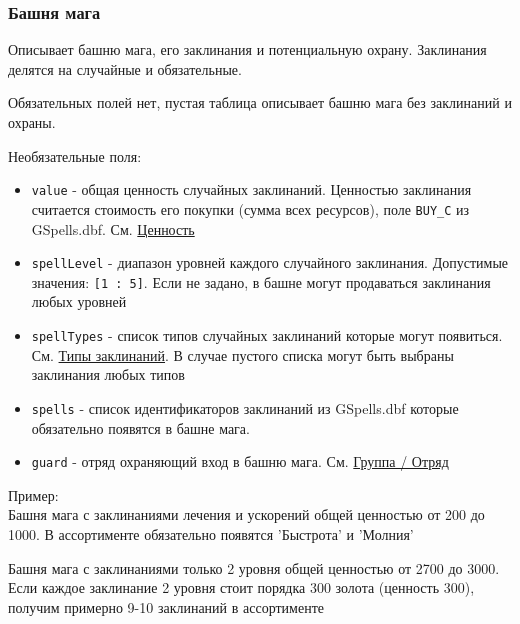 \subsubsection{Башня мага}
\label{mage}
Описывает башню мага, его заклинания и потенциальную охрану. Заклинания делятся на случайные и обязательные.

Обязательных полей нет, пустая таблица описывает башню мага без заклинаний и охраны.

Необязательные поля:
\begin{itemize}
\item \texttt{value} - общая ценность случайных заклинаний. Ценностью заклинания считается стоимость его покупки (сумма всех ресурсов), поле \texttt{BUY\_C} из GSpells.dbf.  См. \hyperref[value]{Ценность}
\item \texttt{spellLevel} - диапазон уровней каждого случайного заклинания. Допустимые значения: \texttt{[1 : 5]}. Если не задано, в башне могут продаваться заклинания любых уровней
\item \texttt{spellTypes} - список типов случайных заклинаний которые могут появиться. См. \hyperref[spellTypes]{Типы заклинаний}. В случае пустого списка могут быть выбраны заклинания любых типов
\item \texttt{spells} - список идентификаторов заклинаний из GSpells.dbf которые обязательно появятся в башне мага.
\item \texttt{guard} - отряд охраняющий вход в башню мага. См. \hyperref[group]{Группа / Отряд}
\end{itemize}

Пример:\\
Башня мага с заклинаниями лечения и ускорений общей ценностью от 200 до 1000.
В ассортименте обязательно появятся 'Быстрота' и 'Молния'

\begin{figure}[H]

\end{figure}

Башня мага с заклинаниями только 2 уровня общей ценностью от 2700 до 3000.
Если каждое заклинание 2 уровня стоит порядка 300 золота (ценность 300),
получим примерно 9-10 заклинаний в ассортименте

\begin{figure}[H]

\end{figure}